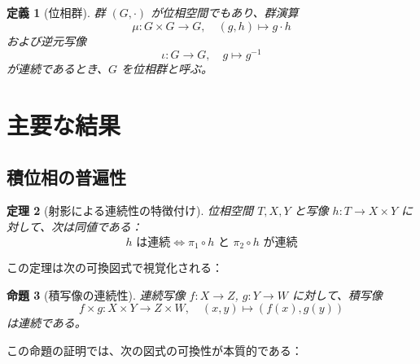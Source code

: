 \documentclass[uplatex, a4paper]{jlreq}
\newtheorem{theorem}{定理}[section]
\newtheorem{definition}[theorem]{定義}
\newtheorem{proposition}[theorem]{命題}
\newcommand{\comp}{\circ}
\newcommand{\inv}{^{-1}}
\begin{document}
\begin{definition}[位相群]
群 $(G, \cdot)$ が位相空間でもあり、群演算
\[
\mu: G \times G \to G, \quad (g, h) \mapsto g \cdot h
\]
および逆元写像
\[
\iota: G \to G, \quad g \mapsto g\inv
\]
が連続であるとき、$G$ を位相群と呼ぶ。
\end{definition}

\section{主要な結果}

\subsection{積位相の普遍性}

\begin{theorem}[射影による連続性の特徴付け]
\label{thm:continuity-by-projections}
位相空間 $T, X, Y$ と写像 $h: T \to X \times Y$ に対して、次は同値である：
\[
h \text{ は連続} \iff \pi_1 \comp h \text{ と } \pi_2 \comp h \text{ が連続}
\]
\end{theorem}

この定理は次の可換図式で視覚化される：

\begin{center}
\end{center}

\begin{proposition}[積写像の連続性]
\label{prop:product-map-continuous}
連続写像 $f: X \to Z$, $g: Y \to W$ に対して、積写像
\[
f \times g: X \times Y \to Z \times W, \quad (x, y) \mapsto (f(x), g(y))
\]
は連続である。
\end{proposition}

この命題の証明では、次の図式の可換性が本質的である：

\begin{center}
\quad {} \quad
{}
\end{center}
\end{document}
